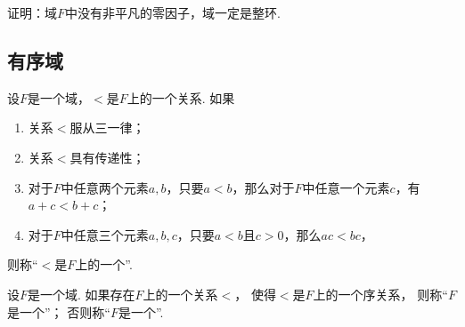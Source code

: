%

\begin{example}
证明：域\(F\)中没有非平凡的零因子，域一定是整环.
\end{example}

\subsection{有序域}
\begin{definition}
设\(F\)是一个域，\(<\)是\(F\)上的一个关系.
如果\begin{enumerate}
	\item 关系\(<\)服从三一律；
	\item 关系\(<\)具有传递性；
	\item 对于\(F\)中任意两个元素\(a,b\)，只要\(a<b\)，那么对于\(F\)中任意一个元素\(c\)，有\(a+c<b+c\)；
	\item 对于\(F\)中任意三个元素\(a,b,c\)，只要\(a<b\)且\(c>0\)，那么\(ac<bc\)，
\end{enumerate}
则称“\(<\)是\(F\)上的一个”.
\end{definition}

\begin{definition}
设\(F\)是一个域.
如果存在\(F\)上的一个关系\(<\)，
使得\(<\)是\(F\)上的一个序关系，
则称“\(F\)是一个”；
否则称“\(F\)是一个”.
\end{definition}


